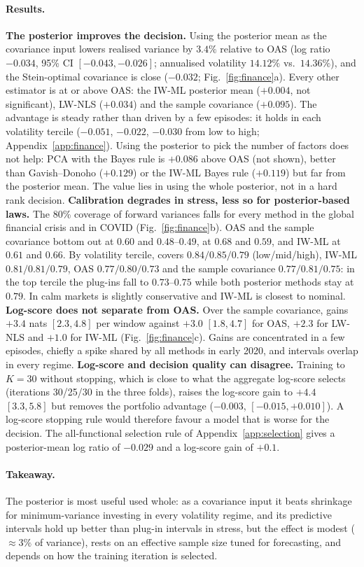 \paragraph{Results.}
\textbf{The posterior improves the decision.}
Using the \scsi{} posterior mean as the covariance input lowers realised variance by $3.4\%$ relative to OAS (log ratio $-0.034$, 95\% CI $[-0.043,-0.026]$; annualised volatility $14.12\%$ vs.\ $14.36\%$), and the Stein-optimal covariance is close ($-0.032$; Fig.~\ref{fig:finance}a).
Every other estimator is at or above OAS: the IW-ML posterior mean ($+0.004$, not significant), LW-NLS ($+0.034$) and the sample covariance ($+0.095$).
The advantage is steady rather than driven by a few episodes: it holds in each volatility tercile ($-0.051$, $-0.022$, $-0.030$ from low to high; Appendix~\ref{app:finance}).
Using the posterior to pick the number of factors does not help: PCA with the \scsi{} Bayes rule is $+0.086$ above OAS (not shown), better than Gavish--Donoho ($+0.129$) or the IW-ML Bayes rule ($+0.119$) but far from the posterior mean.
The value lies in using the whole posterior, not in a hard rank decision.
\textbf{Calibration degrades in stress, less so for posterior-based laws.}
The 80\% coverage of forward variances falls for every method in the global financial crisis and in COVID (Fig.~\ref{fig:finance}b).
OAS and the sample covariance bottom out at $0.60$ and $0.48$--$0.49$, \scsi{} at $0.68$ and $0.59$, and IW-ML at $0.61$ and $0.66$.
By volatility tercile, \scsi{} covers $0.84/0.85/0.79$ (low/mid/high), IW-ML $0.81/0.81/0.79$, OAS $0.77/0.80/0.73$ and the sample covariance $0.77/0.81/0.75$: in the top tercile the plug-ins fall to $0.73$--$0.75$ while both posterior methods stay at $0.79$.
In calm markets \scsi{} is slightly conservative and IW-ML is closest to nominal.
\textbf{Log-score does not separate \scsi{} from OAS.}
Over the sample covariance, \scsi{} gains $+3.4$ nats $[2.3,4.8]$ per window against $+3.0$ $[1.8,4.7]$ for OAS, $+2.3$ for LW-NLS and $+1.0$ for IW-ML (Fig.~\ref{fig:finance}c).
Gains are concentrated in a few episodes, chiefly a spike shared by all methods in early 2020, and intervals overlap in every regime.
\textbf{Log-score and decision quality can disagree.}
Training to $K{=}30$ without stopping, which is close to what the aggregate log-score selects (iterations 30/25/30 in the three folds), raises the \scsi{} log-score gain to $+4.4$ $[3.3,5.8]$ but removes the portfolio advantage ($-0.003$, $[-0.015,+0.010]$).
A log-score stopping rule would therefore favour a model that is worse for the decision.
The all-functional selection rule of Appendix~\ref{app:selection} gives a posterior-mean log ratio of $-0.029$ and a log-score gain of $+0.1$.

\paragraph{Takeaway.}
The posterior is most useful used whole: as a covariance input it beats shrinkage for minimum-variance investing in every volatility regime, and its predictive intervals hold up better than plug-in intervals in stress, but the effect is modest ($\approx 3\%$ of variance), rests on an effective sample size tuned for forecasting, and depends on how the training iteration is selected.
